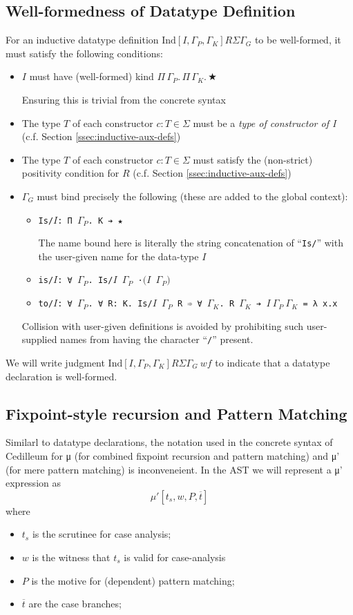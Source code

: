 \documentclass{article}
\newcommand{\ann}[2]{#1\! : \! #2}
\newcommand{\absu}[3]{{#1}\, #2.\, #3}
\newcommand{\indsche}[3]{\ensuremath{\text{Ind}[#1,#2,#3]}}
\newcommand{\mupsche}[4]{μ'[#1,#2,#3,#4]}
\newcommand{\vars}[1]{{\overline{#1}}}
\begin{document}
\subsection{Well-formedness of Datatype Definition}
For an inductive datatype definition
$\indsche{I}{\Gamma_P}{\Gamma_K}{R}{\Sigma}{\Gamma_G}$ to be well-formed, it must satisfy
the following conditions:

\begin{itemize}
\item $I$ must have (well-formed) kind $\absu{\Pi}{\Gamma_P}{\absu{\Pi}{\Gamma_K}{★}}$

  Ensuring this is trivial from the concrete syntax
\item The type $T$ of each constructor $\ann{c}{T} \in \Sigma$ must be a \textit{type of
    constructor of I} (c.f. Section \ref{ssec:inductive-aux-defs})
\item The type $T$ of each constructor $\ann{c}{T} \in \Sigma$ must satisfy the (non-strict)
  positivity condition for $R$ (c.f. Section \ref{ssec:inductive-aux-defs})
\item $\Gamma_G$ must bind precisely the following (these are added to the
  global context):
  \begin{itemize}
  \item \texttt{Is/$I$: Π $\Gamma_P$. K ➔ ★}

    The name bound here is literally the string concatenation of
    ``\texttt{Is/}'' with the user-given name for the data-type $I$
  \item \texttt{is/$I$: ∀ $\Gamma_P$. Is/$I$ $\Gamma_P$ ·$(I$ $\Gamma_P)$}
  \item \texttt{to/$I$: ∀ $\Gamma_P$. ∀ R: K. Is/$I$ $\Gamma_P$ R ➾ ∀
      $\Gamma_K$. R $\Gamma_K$ ➔ $I\ \Gamma_P\ \Gamma_K$ = λ x.x}
  \end{itemize}

  Collision with user-given definitions is avoided by prohibiting such
  user-supplied names from having the character ``\texttt{/}'' present.
\end{itemize}

We will write judgment $\indsche{I}{\Gamma_P}{\Gamma_K}{R}{\Sigma}{\Gamma_G}\ wf$
to indicate that a datatype declaration is well-formed.

\subsection{Fixpoint-style recursion and Pattern Matching}
Similarl to datatype declarations, the notation used in the concrete syntax of
Cedilleum for μ (for combined fixpoint recursion and pattern matching) and μ'
(for mere pattern matching) is inconveneient. In the AST we will represent a μ'
expression as
\[
  \mupsche{t_s}{w}{P}{\vars{t}}
\]
\noindent where
\begin{itemize}
\item $t_s$ is the scrutinee for case analysis;
\item $w$ is the witness that $t_s$ is valid for case-analysis
\item $P$ is the motive for (dependent) pattern matching;
\item $\vars{t}$ are the case branches;
\end{itemize}
\end{document}
